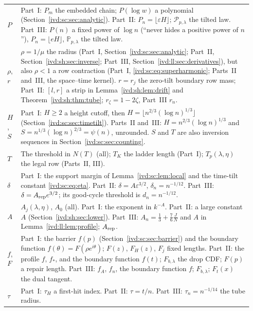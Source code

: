 \documentclass[11pt,letterpaper]{article}
\theoremstyle{remark}\newtheorem{remark}[theorem]{Remark}
\numberwithin{equation}{section}
\newcommand{\Prob}{\mathbb P}\newcommand{\E}{\mathbb E}
\newcommand{\asymplaw}{\mathcal P}
\begin{document}
\begin{longtable}{@{}>{\raggedright\arraybackslash}p{} >{\raggedright\arraybackslash}p{}@{}}
$P$ & Part~I: $P_m$ the embedded chain; $P(\log w)$ a polynomial (Section~\ref{ivd:sc:sec:analytic}). Part~II: $P_n=\lfloor\varepsilon H\rfloor$; $\asymplaw_{p,\lambda}$ the tilted law. Part~III: $P(n)$ a fixed power of $\log n$ (``never hides a positive power of $n$''), $P_n=\lfloor eH\rfloor$, $\Prob_{p,\lambda}$ the tilted law.\\
$\rho$, $r$ & $\rho=1/\mu$ the radius (Part~I, Section~\ref{ivd:sc:sec:analytic}; Part~II, Section~\ref{ivd:sh:sec:inverse}; Part~III, Section~\ref{ivd:ll:sec:derivatives}), but also $\rho<1$ a row contraction (Part~I, \eqref{ivd:sc:eq:superharmonic}; Parts~II and~III, the space--time kernel). $r=r_j$ the zero-tilt boundary row mass; Part~II: $[l,r]$ a strip in Lemma~\ref{ivd:sh:lem:drift} and Theorem~\ref{ivd:sh:thm:tube}; $r_\zeta=1-2\zeta$, Part~III $r_n$.\\
$H$, $S$ & Part~I: $H\ge2$ a height cutoff, then $H=\lfloor n^{2/3}(\log n)^{1/3}\rfloor$ (Section~\ref{ivd:sc:sec:timetilt}). Parts~II and~III: $H=n^{2/3}(\log n)^{1/3}$ and $S=n^{1/3}(\log n)^{2/3}=\psi(n)$, unrounded. $S$ and $T$ are also inversion sequences in Section~\ref{ivd:sc:sec:counting}.\\
$T$ & The threshold in $N(T)$ (all); $T_K$ the ladder length (Part~I); $T_p(\lambda,\eta)$ the legal row (Parts~II, III).\\
$\delta$ & Part~I: the support margin of Lemma~\ref{ivd:sc:lem:local} and the time-tilt constant \eqref{ivd:sc:eq:eta}. Part~II: $\delta=A\varepsilon^{3/2}$, $\delta_n=n^{-1/12}$. Part~III: $\delta=A_{\rm rep}e^{3/2}$; its good-cycle threshold is $d_n=n^{-1/12}$.\\
$A$ & $A_j(\lambda,\eta)$, $A_0$ (all). Part~I: the exponent in $k^{-A}$. Part~II: a large constant $A$ (Section~\ref{ivd:sh:sec:lower}). Part~III: $A_n=\frac13+\frac76\frac JN$ and $A$ in Lemma~\ref{ivd:ll:lem:profile}; $A_{\rm rep}$.\\
$f$, $F$ & Part~I: the barrier $f(p)$ (Section~\ref{ivd:sc:sec:barrier}) and the boundary function $f(\theta)=F(\rho e^{i\theta})$; $F(z)$, $F_H(z)$, $F_j$ fixed lengths. Part~II: the profile $f$, $f_*$, and the boundary function $f(t)$; $F_{b,\lambda}$ the drop CDF; $F(p)$ a repair length. Part~III: $f_A$, $f_n$, the boundary function $f$; $F_{b,\lambda}$; $F_t(x)$ the dual tangent.\\
$\tau$ & Part~I: $\tau_H$ a first-hit index. Part~II: $\tau=t/n$. Part~III: $\tau_n=n^{-1/14}$ the tube radius.\\
\bottomrule
\end{longtable}
\endgroup
\end{document}

